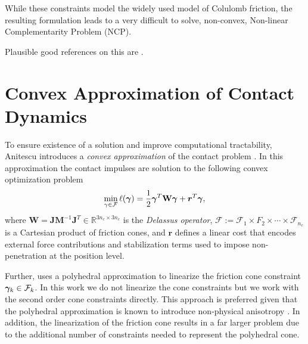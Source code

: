 While these constraints model the widely used model of Colulomb friction, the
resulting formulation leads to a very difficult to solve, non-convex, Non-linear
Complementarity Problem (NCP). 



Plausible good references on this are
\cite{bib:stewart1996implicit,bib:stewart2000implicit,bib:chakraborty2007implicit,bib:acary2018solving,bib:pang1999unified,bib:alart2018inconsistency}.

\section{Convex Approximation of Contact Dynamics}
\label{sec:previous_work}

To ensure existence of a solution and improve computational tractability,
Anitescu introduces a \textit{convex approximation} of the contact
problem \cite{bib:anitescu2006}. In this approximation the contact impulses are
solution to the following convex optimization problem
\begin{eqnarray}
	\min_{\gamma\in \mathcal{F}} \ell(\bgamma) =
	\frac{1}{2}\bgamma^T\mathbf{W}\bgamma + {\bm r}^T
	\bgamma,
	\label{eq:dual_cost}
\end{eqnarray}
where $\mathbf{W} =
\mathbf{J}\mathbf{M}^{-1}\mathbf{J}^T\in\mathbb{R}^{3n_c\times 3n_c}$ is the
\emph{Delassus operator}, $\mathcal{F} := \mathcal{F}_1 \times F_2 \times \cdots
\times \mathcal{F}_{n_c}$ is a Cartesian product of friction cones, and ${\bm
r}$ defines a linear cost  that encodes external force contributions and
stabilization terms used to impose non-penetration at the position level.

Further, \cite{bib:anitescu2006} uses a polyhedral approximation to linearize
the friction cone constraint ${\bm\gamma}_k\in\mathcal{F}_k$. In this work we do not
linearize the cone constraints but we work with the second order cone
constraints directly. This approach is preferred given that the polyhedral
approximation is known to introduce non-physical anisotropy
\cite{bib:li2018implicit}. In addition, the linearization of the friction cone
results in a far larger problem due to the additional number of constraints
needed to represent the polyhedral cone.

